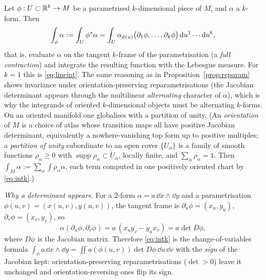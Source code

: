 Let $\phi:U\subset\mathbb{R}^k\to M$ be a parametrised $k$-dimensional piece of $M$, and $\alpha$ a $k$-form. Then
\begin{equation}\label{eq:intk}
\int_\phi\alpha:=\int_U\phi\pb\alpha=\int_U\alpha_{\phi(u)}\bigl(\partial_1\phi,\dots,\partial_k\phi\bigr)\,\dd u^1\cdots\dd u^k,
\end{equation}
that is, evaluate $\alpha$ on the tangent $k$-frame of the parametrisation (a \emph{full contraction}) and integrate the resulting function with the Lebesgue measure. For $k=1$ this is \eqref{eq:lineint}.
The same reasoning as in Proposition~\ref{prop:reparam} shows invariance under orientation-preserving reparametrisations (the Jacobian determinant appears through the multilinear \emph{alternating} character of $\alpha$), which is why the integrands of oriented $k$-dimensional objects must be alternating $k$-forms. On an oriented manifold one globalises with a partition of unity.
(An \emph{orientation} of $M$ is a choice of atlas whose transition maps all have positive Jacobian determinant, equivalently a
nowhere-vanishing top form up to positive multiples; a \emph{partition of unity} subordinate to an open cover $\{U_\alpha\}$ is a family of
smooth functions $\rho_\alpha\ge0$ with $\operatorname{supp}\rho_\alpha\subset U_\alpha$, locally finite, and $\sum_\alpha\rho_\alpha=1$.
Then $\int_M\alpha:=\sum_\alpha\int\rho_\alpha\alpha$, each term computed in one positively oriented chart by \eqref{eq:intk}.)

\emph{Why a determinant appears.} For a $2$-form $\alpha=a\,\dd x\wedge\dd y$ and a parametrisation $\phi(u,v)=(x(u,v),y(u,v))$, the tangent frame is $\partial_u\phi=(x_u,y_u)$, $\partial_v\phi=(x_v,y_v)$, so
\[
\alpha(\partial_u\phi,\partial_v\phi)=a\,(x_uy_v-y_ux_v)=a\det D\phi,
\]
where $D\phi$ is the Jacobian matrix. Therefore \eqref{eq:intk} is the change-of-variables formula $\int_\phi a\,\dd x\wedge\dd y=\iint a(\phi(u,v))\det D\phi\,\dd u\,\dd v$ with the \emph{sign} of the Jacobian kept: orientation-preserving reparametrisations ($\det>0$) leave it unchanged and orientation-reversing ones flip its sign.

